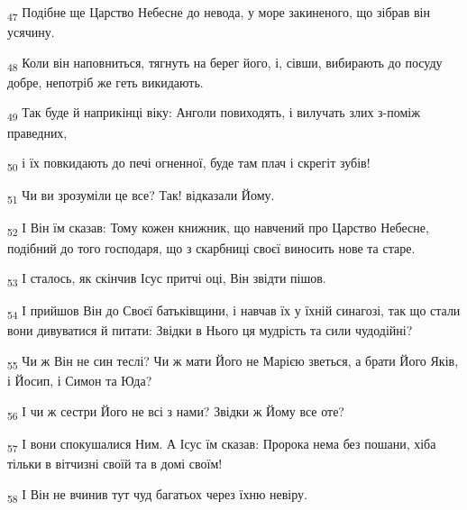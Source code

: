 \begin{tcolorbox}
\textsubscript{47} Подібне ще Царство Небесне до невода, у море закиненого, що зібрав він усячину.
\end{tcolorbox}
\begin{tcolorbox}
\textsubscript{48} Коли він наповниться, тягнуть на берег його, і, сівши, вибирають до посуду добре, непотріб же геть викидають.
\end{tcolorbox}
\begin{tcolorbox}
\textsubscript{49} Так буде й наприкінці віку: Анголи повиходять, і вилучать злих з-поміж праведних,
\end{tcolorbox}
\begin{tcolorbox}
\textsubscript{50} і їх повкидають до печі огненної, буде там плач і скрегіт зубів!
\end{tcolorbox}
\begin{tcolorbox}
\textsubscript{51} Чи ви зрозуміли це все? Так! відказали Йому.
\end{tcolorbox}
\begin{tcolorbox}
\textsubscript{52} І Він їм сказав: Тому кожен книжник, що навчений про Царство Небесне, подібний до того господаря, що з скарбниці своєї виносить нове та старе.
\end{tcolorbox}
\begin{tcolorbox}
\textsubscript{53} І сталось, як скінчив Ісус притчі оці, Він звідти пішов.
\end{tcolorbox}
\begin{tcolorbox}
\textsubscript{54} І прийшов Він до Своєї батьківщини, і навчав їх у їхній синагозі, так що стали вони дивуватися й питати: Звідки в Нього ця мудрість та сили чудодійні?
\end{tcolorbox}
\begin{tcolorbox}
\textsubscript{55} Чи ж Він не син теслі? Чи ж мати Його не Марією зветься, а брати Його Яків, і Йосип, і Симон та Юда?
\end{tcolorbox}
\begin{tcolorbox}
\textsubscript{56} І чи ж сестри Його не всі з нами? Звідки ж Йому все оте?
\end{tcolorbox}
\begin{tcolorbox}
\textsubscript{57} І вони спокушалися Ним. А Ісус їм сказав: Пророка нема без пошани, хіба тільки в вітчизні своїй та в домі своїм!
\end{tcolorbox}
\begin{tcolorbox}
\textsubscript{58} І Він не вчинив тут чуд багатьох через їхню невіру.
\end{tcolorbox}
